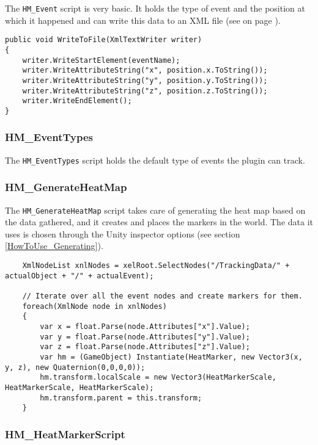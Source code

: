 The \texttt{HM\_Event} script is very basic. It holds the type of event and the position at which it happened and can write this data to an XML file (see  on page \pageref{code:OFS_01}).

\begin{lstlisting}
public void WriteToFile(XmlTextWriter writer)
{
	writer.WriteStartElement(eventName);
	writer.WriteAttributeString("x", position.x.ToString());
	writer.WriteAttributeString("y", position.y.ToString());
	writer.WriteAttributeString("z", position.z.ToString());
	writer.WriteEndElement();
}
\end{lstlisting}

\subsubsection*{HM\_EventTypes}

The \texttt{HM\_EventTypes} script holds the default type of events the plugin can track.

\subsubsection*{HM\_GenerateHeatMap}

The \texttt{HM\_GenerateHeatMap} script takes care of generating the heat map based on the data gathered, and it creates and places the markers in the world. The data it uses is chosen through the Unity inspector options (see section \ref{HowToUse_Generating}).

\begin{lstlisting}
	XmlNodeList xnlNodes = xelRoot.SelectNodes("/TrackingData/" + actualObject + "/" + actualEvent);
	
	// Iterate over all the event nodes and create markers for them.
	foreach(XmlNode node in xnlNodes)
	{
		var x = float.Parse(node.Attributes["x"].Value);
		var y = float.Parse(node.Attributes["y"].Value);
		var z = float.Parse(node.Attributes["z"].Value);
		var hm = (GameObject) Instantiate(HeatMarker, new Vector3(x, y, z), new Quaternion(0,0,0,0));
		hm.transform.localScale = new Vector3(HeatMarkerScale, HeatMarkerScale, HeatMarkerScale);
		hm.transform.parent = this.transform;
	}
\end{lstlisting}

\subsubsection*{HM\_HeatMarkerScript}

